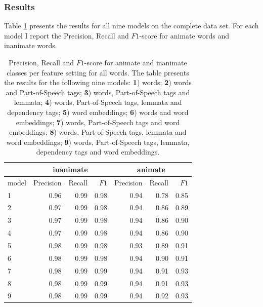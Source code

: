 \subsubsection{Results}\label{sec:animacy-results}

Table \ref{tab:results-all} presents the results for all nine models on the complete data set. For each model I report the Precision, Recall and $F1$-score for animate words and inanimate words.

\begin{table}[t]
\centering
\begin{tabular}{lrrrrrr}
\toprule
                       & \multicolumn{3}{c}{inanimate} & \multicolumn{3}{c}{animate} \\ \midrule
model                  & Precision  & Recall & $F1$            & Precision  & Recall & $F1$  \\ \cmidrule(r){1-7}
1                      & 0.96 & 0.99 & 0.98            & 0.94 & 0.78 & 0.85  \\
2                      & 0.97 & 0.99 & 0.98            & 0.94 & 0.86 & 0.89  \\
3                      & 0.97 & 0.99 & 0.98            & 0.94 & 0.86 & 0.90  \\
4                      & 0.97 & 0.99 & 0.98            & 0.94 & 0.86 & 0.90  \\
5                      & 0.98 & 0.99 & 0.98            & 0.93 & 0.89 & 0.91  \\
6                      & 0.98 & 0.99 & 0.98            & 0.94 & 0.90 & 0.91  \\
\rowcolor{lightgray}7  & 0.98 & 0.99 & 0.99            & 0.94 & 0.91 & 0.93  \\
8                      & 0.98 & 0.99 & 0.99            & 0.94 & 0.91 & 0.93  \\
9                      & 0.98 & 0.99 & 0.99            & 0.94 & 0.92 & 0.93  \\
\bottomrule
\end{tabular}
\caption[Animacy classification results on the complete data set.]{Precision, Recall and $F1$-score for animate and inanimate classes per feature setting for all words. The table presents the results for the following nine models: \textbf{1}) words; \textbf{2}) words and Part-of-Speech tags; \textbf{3}) words, Part-of-Speech tags and lemmata; \textbf{4}) words, Part-of-Speech tags, lemmata and dependency tags; \textbf{5}) word embeddings; \textbf{6}) words and word embeddings; \textbf{7}) words, Part-of-Speech tags and word embeddings; \textbf{8}) words, Part-of-Speech tags, lemmata and word embeddings; \textbf{9}) words, Part-of-Speech tags, lemmata, dependency tags and word embeddings.}
\label{tab:results-all}
\end{table}

